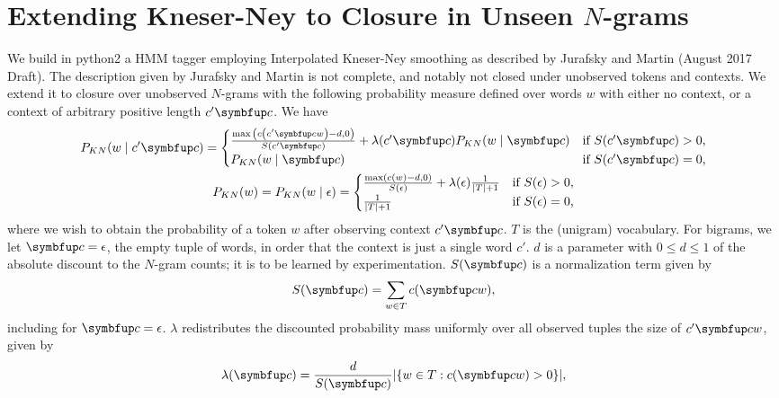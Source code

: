 \documentclass[12pt,article,oneside,onecolumn,final,a4paper]{memoir}
\theoremstyle{myplain}
\theoremstyle{nonumbermyplain}
\theoremstyle{myplain}
\theoremstyle{nonumbermyplain}
\theoremstyle{nonumberproof}
\theoremstyle{nonumbersolution}
\numberwithin{equation}{chapter}
\begin{document}
\makeassignmenttitle{}

\setcounter{chapter}{1}

\setcounter{thm}{4}

\section{Extending Kneser-Ney to Closure in Unseen \(N\)-grams}

We build in python2 a HMM tagger employing Interpolated Kneser-Ney
smoothing as described by Jurafsky and Martin (August 2017 Draft). The
description given by Jurafsky and Martin is not complete, and notably
not closed under unobserved tokens and contexts. We extend it to
closure over unobserved \(N\)-grams with the following probability
measure defined over words \(w\) with either no context, or a context
of arbitrary positive length \(c'\w{c}\). We have
\begin{gather*}
  P_{KN}\p{w\mid c'\w{c}}=
  \begin{cases}
    \frac{\max{\p{c\p{c'\w{c}w}-d,0}}}{S\p{c'\w{c}}}
    +\lambda\p{c'\w{c}}P_{KN}\p{w\mid\w{c}} &
    \text{if \(S\p{c'\w{c}}>0\),}\\
    P_{KN}\p{w\mid\w{c}} &
    \text{if \(S\p{c'\w{c}}=0\),}\\
  \end{cases} \\
  P_{KN}\p{w}=P_{KN}\p{w\mid\epsilon}=
  \begin{cases}
    \frac{\max\p{c\p{w}-d,0}}{S\p{\epsilon}}+\lambda\p{\epsilon}\frac{1}{\abs{T}+1}
    &\text{if \(S\p{\epsilon}>0\),} \\
    \frac{1}{\abs{T}+1}&\text{if \(S\p{\epsilon}=0\),}
  \end{cases}
\end{gather*}
where we wish to obtain the probability of a token \(w\) after
observing context \(c'\w{c}\). \(T\) is the (unigram) vocabulary. For
bigrams, we let \(\w{c}=\epsilon\), the empty tuple of words, in order that
the context is just a single word \(c'\). \(d\) is a parameter with
\(0\leq d\leq 1\) of the absolute discount to the \(N\)-gram counts; it is
to be learned by experimentation. \(S\p{\w{c}}\) is a normalization
term given by
\begin{equation*}
  S\p{\w{c}}=\sum_{w\in T}c\p{\w{c}w},
\end{equation*}
including for \(\w{c}=\epsilon\). \(\lambda\) redistributes the discounted probability mass
uniformly over all observed tuples the size of \(c'\w{c}w\), given by
\begin{equation*}
  \lambda\p{\w{c}}=\frac{d}{S\p{\w{c}}}\abs{\B{w\in T:c\p{\w{c}w}>0}},
\end{equation*}
\end{document}
